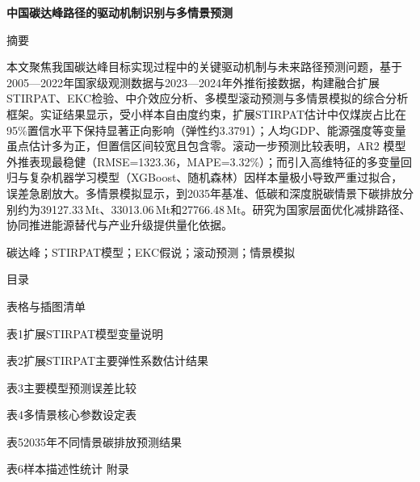 \documentclass[12pt,a4paper]{ctexart}
\newcommand{\keywords}[1]{%
  \vspace{0.9em}%
  \noindent{\bfseries 关键词：}#1\par%
}
\begin{document}
\clearpage
\thispagestyle{empty}
\vspace*{0.6cm}
\begin{center}
    {\songti{} \textbf{中国碳达峰路径的驱动机制识别与多情景预测}}
\end{center}
\vspace{1.5em}
\begin{center}
{\centering\heiti{} 摘要\par}
\end{center}
\vspace{0.6em}

\setlength{\parindent}{2em}
本文聚焦我国碳达峰目标实现过程中的关键驱动机制与未来路径预测问题，基于2005—2022年国家级观测数据与2023—2024年外推衔接数据，构建融合扩展STIRPAT、EKC检验、中介效应分析、多模型滚动预测与多情景模拟的综合分析框架。实证结果显示，受小样本自由度约束，扩展STIRPAT估计中仅煤炭占比在95\%置信水平下保持显著正向影响（弹性约3.3791）；人均GDP、能源强度等变量虽点估计多为正，但置信区间较宽且包含零。滚动一步预测比较表明，AR2 模型外推表现最稳健（RMSE=1323.36，MAPE=3.32\%）；而引入高维特征的多变量回归与复杂机器学习模型（XGBoost、随机森林）因样本量极小导致严重过拟合，误差急剧放大。多情景模拟显示，到2035年基准、低碳和深度脱碳情景下碳排放分别约为39127.33\,Mt、33013.06\,Mt和27766.48\,Mt。研究为国家层面优化减排路径、协同推进能源替代与产业升级提供量化依据。

\keywords{碳达峰；STIRPAT模型；EKC假说；滚动预测；情景模拟}

\clearpage
\thispagestyle{empty}
{\centering\heiti{} 目录\par}
\vspace{0.5em}
\begingroup
\renewcommand{\contentsname}{}
\tableofcontents
\endgroup
\clearpage

\clearpage
\thispagestyle{empty}
{\centering\heiti{} 表格与插图清单\par}
\vspace{1em}

\par
\vspace{0.5em}
\noindent 表1\quad 扩展STIRPAT模型变量说明 \dotfill \pageref{tab:stirpat_vars}\par
\noindent 表2\quad 扩展STIRPAT主要弹性系数估计结果 \dotfill \pageref{tab:stirpat_coeff}\par
\noindent 表3\quad 主要模型预测误差比较 \dotfill \pageref{tab:model_perf}\par
\noindent 表4\quad 多情景核心参数设定表 \dotfill \pageref{tab:scenario_params}\par
\noindent 表5\quad 2035年不同情景碳排放预测结果 \dotfill \pageref{tab:scenario_2035}\par
\noindent 表6\quad 样本描述性统计 \dotfill 附录\par
\end{document}
